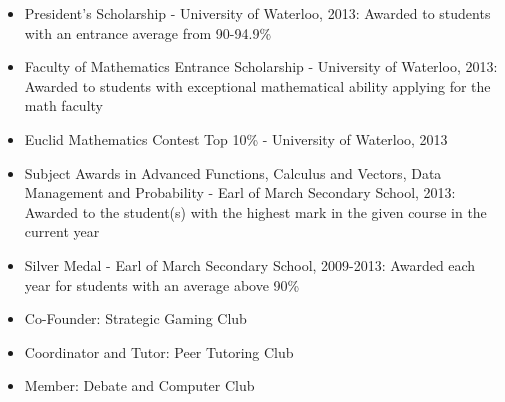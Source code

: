 \documentclass[12pt]{article}
\begin{document}
\begin{minipage}[t]{0.8\linewidth}
	\begin{itemize}
		\item President's Scholarship - University of Waterloo, 2013: Awarded to students with an entrance average 				from 90-94.9\%
		\item Faculty of Mathematics Entrance Scholarship - University of Waterloo, 2013: Awarded to students with 				exceptional mathematical ability applying for the math faculty
		\item Euclid Mathematics Contest Top 10\% - University of Waterloo, 2013	
		\item Subject Awards in Advanced Functions, Calculus and Vectors, Data Management and Probability - Earl 						of March Secondary School, 2013: Awarded to the student(s) with the highest mark in the given 						course in the current year
		\item Silver Medal - Earl of March Secondary School, 2009-2013: Awarded each year for students with an 						average above 90\%
	\end{itemize} \vspace{12pt}
	
	\begin{itemize}
		\item Co-Founder: Strategic Gaming Club
		\item Coordinator and Tutor: Peer Tutoring Club
		\item Member: Debate and Computer Club 
	\end{itemize} 
\end{minipage}
	
\end{document}
